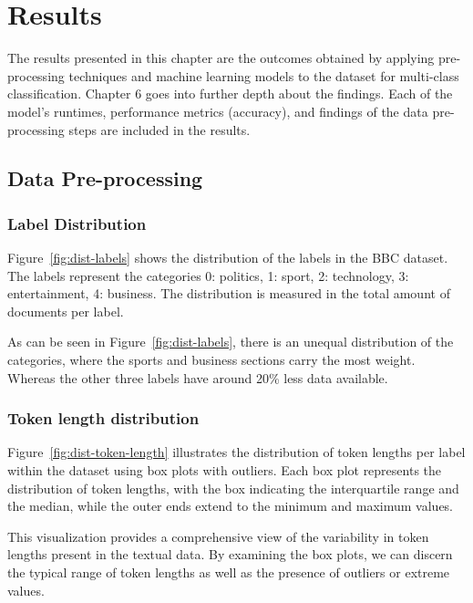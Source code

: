 \chapter{Results}

The results presented in this chapter are the outcomes obtained by applying pre-processing techniques and machine learning models to the dataset for multi-class classification. Chapter 6 goes into further depth about the findings. Each of the model’s runtimes, performance metrics (accuracy), and findings of the data pre-processing steps are included in the results. 

\section{Data Pre-processing}
\subsection{Label Distribution}


Figure~\ref{fig:dist-labels} shows the distribution of the labels in the BBC dataset. The labels represent the categories 0: politics, 1: sport, 2: technology, 3: entertainment, 4: business. The distribution is measured in the total amount of documents per label.

As can be seen in Figure~\ref{fig:dist-labels}, there is an unequal distribution of the categories, where the sports and business sections carry the most weight. Whereas the other three labels have around 20\% less data available.

\subsection{Token length distribution}


Figure~\ref{fig:dist-token-length} illustrates the distribution of token lengths per label within the dataset using box plots with outliers. Each box plot represents the distribution of token lengths, with the box indicating the interquartile range and the median, while the outer ends extend to the minimum and maximum values.

This visualization provides a comprehensive view of the variability in token lengths present in the textual data. By examining the box plots, we can discern the typical range of token lengths as well as the presence of outliers or extreme values.

